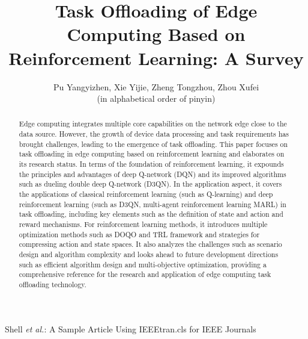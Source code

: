 \documentclass[journal]{IEEEtran}
\begin{document}
\title{Task Offloading of Edge Computing Based on Reinforcement Learning: A Survey}

\author{Pu Yangyizhen, Xie Yijie, Zheng Tongzhou, Zhou Xufei \\ (in alphabetical order of pinyin)}

%
{Shell \MakeLowercase{\textit{et al.}}: A Sample Article Using IEEEtran.cls for IEEE Journals}


\maketitle

\begin{abstract}
Edge computing integrates multiple core capabilities on the network edge close to the data source. However, the growth of device data processing and task requirements has brought challenges, leading to the emergence of task offloading. This paper focuses on task offloading in edge computing based on reinforcement learning and elaborates on its research status. In terms of the foundation of reinforcement learning, it expounds the principles and advantages of deep Q-network (DQN) and its improved algorithms such as dueling double deep Q-network (D3QN). In the application aspect, it covers the applications of classical reinforcement learning (such as Q-learning) and deep reinforcement learning (such as D3QN, multi-agent reinforcement learning MARL) in task offloading, including key elements such as the definition of state and action and reward mechanisms. For reinforcement learning methods, it introduces multiple optimization methods such as DOQO and TRL framework and strategies for compressing action and state spaces. It also analyzes the challenges such as scenario design and algorithm complexity and looks ahead to future development directions such as efficient algorithm design and multi-objective optimization, providing a comprehensive reference for the research and application of edge computing task offloading technology.
\end{abstract}
\end{document}
